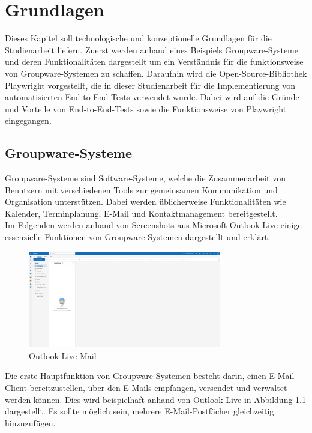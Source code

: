 \chapter{Grundlagen}

Dieses Kapitel soll technologische und konzeptionelle Grundlagen für die Studienarbeit liefern.
Zuerst werden anhand eines Beispiels Groupware-Systeme und deren Funktionalitäten dargestellt um ein Verständnis für die funktionsweise von Groupware-Systemen zu schaffen.
Daraufhin wird die Open-Source-Bibliothek Playwright vorgestellt, die in dieser Studienarbeit für die Implementierung von automatisierten End-to-End-Tests verwendet wurde.
Dabei wird auf die Gründe und Vorteile von End-to-End-Tests sowie die Funktionsweise von Playwright eingegangen.

\section{Groupware-Systeme}

Groupware-Systeme sind Software-Systeme, welche die Zusammenarbeit von Benutzern mit verschiedenen Tools zur gemeinsamen Kommunikation und Organisation unterstützen.
Dabei werden üblicherweise Funktionalitäten wie Kalender, Terminplanung, E-Mail und Kontaktmanagement bereitgestellt.
\\
Im Folgenden werden anhand von Screenshots aus Microsoft Outlook-Live einige essenzielle Funktionen von Groupware-Systemen dargestellt und erklärt.
\begin{figure}[H]
    \centering
    \includegraphics[width=0.75\textwidth]{images/OutlookLive_Mail1.png}
    \caption{Outlook-Live Mail}
    \label{fig:outlook-live-mail}
\end{figure}
Die erste Hauptfunktion von Groupware-Systemen besteht darin, einen E-Mail-Client bereitzustellen, über den E-Mails empfangen, versendet und verwaltet werden können. Dies wird beispielhaft anhand von Outlook-Live in Abbildung \ref{fig:outlook-live-mail} dargestellt.
Es sollte möglich sein, mehrere E-Mail-Postfächer gleichzeitig hinzuzufügen.


